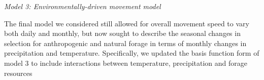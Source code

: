 \documentclass[a4paper]{article}
\begin{document}
\noindent
\emph{Model 3: Environmentally-driven movement model}

The final model we considered still allowed for overall movement speed to vary both daily and monthly, but now sought to describe the seasonal changes in selection for anthropogenic and natural forage in terms of monthly changes in precipitation and temperature.  Specifically, we updated the basis function form of model 3 to include interactions between temperature, precipitation and forage resources 




\end{document}
